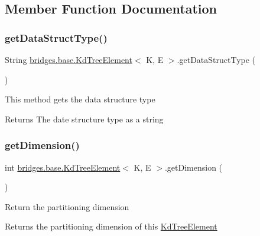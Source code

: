 \subsection{Member Function Documentation}
\mbox{\label{classbridges_1_1base_1_1_kd_tree_element_a56b98bd1f3e1e5c0c37519c4b3cf5ba2}} 
\subsubsection{\texorpdfstring{get\+Data\+Struct\+Type()}{getDataStructType()}}
{\footnotesize\ttfamily String \mbox{\hyperlink{classbridges_1_1base_1_1_kd_tree_element}{bridges.\+base.\+Kd\+Tree\+Element}}$<$ K, E $>$.get\+Data\+Struct\+Type (\begin{DoxyParamCaption}{ }\end{DoxyParamCaption})}

This method gets the data structure type

\begin{DoxyReturn}{Returns}
The date structure type as a string 
\end{DoxyReturn}
\mbox{\label{classbridges_1_1base_1_1_kd_tree_element_a2469fcfe38e921ae48338ef1fd347c4a}} 
\subsubsection{\texorpdfstring{get\+Dimension()}{getDimension()}}
{\footnotesize\ttfamily int \mbox{\hyperlink{classbridges_1_1base_1_1_kd_tree_element}{bridges.\+base.\+Kd\+Tree\+Element}}$<$ K, E $>$.get\+Dimension (\begin{DoxyParamCaption}{ }\end{DoxyParamCaption})}

Return the partitioning dimension

\begin{DoxyReturn}{Returns}
the partitioning dimension of this \mbox{\hyperlink{classbridges_1_1base_1_1_kd_tree_element}{Kd\+Tree\+Element}} 
\end{DoxyReturn}
\mbox{\label{classbridges_1_1base_1_1_kd_tree_element_a257367edc8f204c973eb277dcb5d37be}} 
